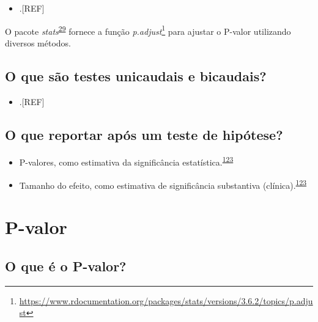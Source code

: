 \documentclass[
  a4paper,
]{book}
\providecommand{\tightlist}{%
  \setlength{\itemsep}{0pt}\setlength{\parskip}{0pt}}
\renewcommand{\href}[2]{#2\footnote{\url{#1}}}
\newenvironment{infobox}[1]
  {
  \begin{itemize}
  \renewcommand{\labelitemi}{
    \raisebox{-.7\height}[0pt][0pt]{
      {\setkeys{Gin}{width=3em,keepaspectratio}
        \texttt{[image: \#1]}}
    }
  }
  \setlength{\fboxsep}{1em}
  \begin{blackbox}
  \item
  }
  {
  \end{blackbox}
  \end{itemize}
  }
\begin{document}
\begin{itemize}
\tightlist
\item
  .{[}REF{]}
\end{itemize}

\begin{infobox}{images/Rlogo}
O pacote \emph{stats}\textsuperscript{\protect\hyperlink{ref-stats-2}{29}} fornece a função \href{https://www.rdocumentation.org/packages/stats/versions/3.6.2/topics/p.adjust}{\emph{p.adjust}} para ajustar o P-valor utilizando diversos métodos.

\end{infobox}

\hypertarget{o-que-suxe3o-testes-unicaudais-e-bicaudais}{%
\subsection{O que são testes unicaudais e bicaudais?}\label{o-que-suxe3o-testes-unicaudais-e-bicaudais}}

\begin{itemize}
\tightlist
\item
  .{[}REF{]}
\end{itemize}

\hypertarget{o-que-reportar-apuxf3s-um-teste-de-hipuxf3tese}{%
\subsection{O que reportar após um teste de hipótese?}\label{o-que-reportar-apuxf3s-um-teste-de-hipuxf3tese}}

\begin{itemize}
\item
  P-valores, como estimativa da significância estatística.\textsuperscript{\protect\hyperlink{ref-Sullivan2012}{123}}
\item
  Tamanho do efeito, como estimativa de significância substantiva (clínica).\textsuperscript{\protect\hyperlink{ref-Sullivan2012}{123}}
\end{itemize}

\hypertarget{p-valor}{%
\section{P-valor}\label{p-valor}}

\hypertarget{o-que-uxe9-o-p-valor}{%
\subsection{O que é o P-valor?}\label{o-que-uxe9-o-p-valor}}
\end{document}
